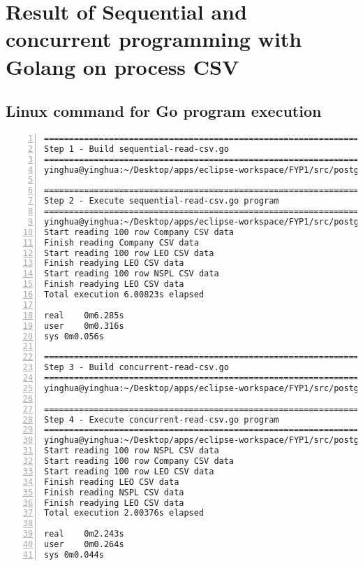 \chapter{Result of Sequential and concurrent programming with Golang on process CSV} 
\label{AppendixF} 


\section {Linux command for Go program execution}

\lstset{basicstyle=\ttfamily\tiny}  
\begin{lstlisting}[breaklines, frame=single, numbers=left, caption={Linux command for Go program execution}, label=commandline-02]
================================================================
Step 1 - Build sequential-read-csv.go 
================================================================
yinghua@yinghua:~/Desktop/apps/eclipse-workspace/FYP1/src/postgres-process$ go build sequential-read-csv.go

================================================================
Step 2 - Execute sequential-read-csv.go program
================================================================
yinghua@yinghua:~/Desktop/apps/eclipse-workspace/FYP1/src/postgres-process$ time go run sequential-read-csv.go
Start reading 100 row Company CSV data
Finish reading Company CSV data
Start reading 100 row LEO CSV data
Finish readying LEO CSV data
Start reading 100 row NSPL CSV data
Finish readying LEO CSV data
Total execution 6.00823s elapsed

real	0m6.285s
user	0m0.316s
sys	0m0.056s

================================================================
Step 3 - Build concurrent-read-csv.go 
================================================================
yinghua@yinghua:~/Desktop/apps/eclipse-workspace/FYP1/src/postgres-process$ go build concurrent-read-csv.go

================================================================
Step 4 - Execute concurrent-read-csv.go program 
================================================================
yinghua@yinghua:~/Desktop/apps/eclipse-workspace/FYP1/src/postgres-process$ time go run concurrent-read-csv.go
Start reading 100 row NSPL CSV data
Start reading 100 row Company CSV data
Start reading 100 row LEO CSV data
Finish reading LEO CSV data
Finish reading NSPL CSV data
Finish readying LEO CSV data
Total execution 2.00376s elapsed

real	0m2.243s
user	0m0.264s
sys	0m0.044s
\end{lstlisting}

